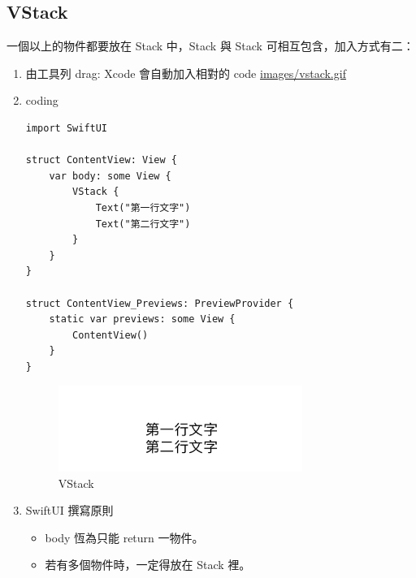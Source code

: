 \documentclass[a4paper,12pt]{article}
\begin{document}
\subsection{VStack}
\label{sec:org04d4e73}

一個以上的物件都要放在 Stack 中，Stack 與 Stack 可相互包含，加入方式有二：\\
\begin{enumerate}
\item 由工具列 drag: Xcode 會自動加入相對的 code
\label{sec:org6cf9367}
\url{images/vstack.gif}\\
\item coding
\label{sec:org6cb08be}
\lstset{breaklines=true,language=swift,label= ,caption= ,captionpos=b,firstnumber=1,numbers=left}
\begin{lstlisting}
import SwiftUI

struct ContentView: View {
    var body: some View {
        VStack {
            Text("第一行文字")
            Text("第二行文字")
        }
    }
}

struct ContentView_Previews: PreviewProvider {
    static var previews: some View {
        ContentView()
    }
}
\end{lstlisting}

\begin{figure}[htbp]
\centering
\includegraphics[width=300]{images/vstack-1.jpg}
\caption{\label{fig:VStack-1}VStack}
\end{figure}
\item SwiftUI 撰寫原則
\label{sec:org6e331c7}
\begin{itemize}
\item body 恆為只能 return 一物件。\\
\item 若有多個物件時，一定得放在 Stack 裡。\\
\end{itemize}
\end{enumerate}
\end{document}
